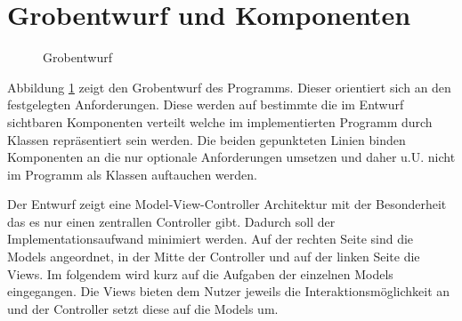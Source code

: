 \documentclass[a4paper]{scrartcl}
\begin{document}
\section{Grobentwurf und Komponenten}
\begin{figure}[ht]
  \begin{center}
  \end{center}
\caption{Grobentwurf}
\label{Grobentwurf}
\end{figure}

Abbildung \ref{Grobentwurf} zeigt den Grobentwurf des Programms. Dieser orientiert sich an den festgelegten Anforderungen. Diese werden auf bestimmte die im Entwurf sichtbaren Komponenten verteilt welche im implementierten Programm durch Klassen repräsentiert sein werden. Die beiden gepunkteten Linien binden Komponenten an die nur optionale Anforderungen umsetzen und daher u.U. nicht im Programm als Klassen auftauchen werden.

Der Entwurf zeigt eine Model-View-Controller Architektur mit der Besonderheit das es nur einen zentrallen Controller gibt. Dadurch soll der Implementationsaufwand minimiert werden. Auf der rechten Seite sind die Models angeordnet, in der Mitte der Controller und auf der linken Seite die Views. Im folgendem wird kurz auf die Aufgaben der einzelnen Models eingegangen. Die Views bieten dem Nutzer jeweils die Interaktionsmöglichkeit an und der Controller setzt diese auf die Models um.
\end{document}
